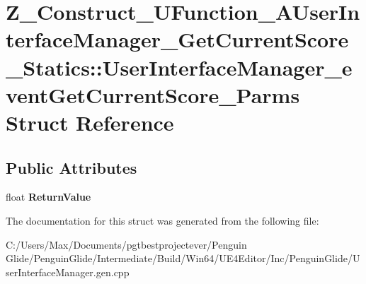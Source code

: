 \hypertarget{struct_z___construct___u_function___a_user_interface_manager___get_current_score___statics_1_1_u037d1197953daf6466aa6ebf222cb735}{}\section{Z\+\_\+\+Construct\+\_\+\+U\+Function\+\_\+\+A\+User\+Interface\+Manager\+\_\+\+Get\+Current\+Score\+\_\+\+Statics\+::User\+Interface\+Manager\+\_\+event\+Get\+Current\+Score\+\_\+\+Parms Struct Reference}
\label{struct_z___construct___u_function___a_user_interface_manager___get_current_score___statics_1_1_u037d1197953daf6466aa6ebf222cb735}
\subsection*{Public Attributes}
\begin{DoxyCompactItemize}
\item 
\mbox{\label{struct_z___construct___u_function___a_user_interface_manager___get_current_score___statics_1_1_u037d1197953daf6466aa6ebf222cb735_afd0496b66c21801ef6dea6b56271d96f}} 
float {\bfseries Return\+Value}
\end{DoxyCompactItemize}


The documentation for this struct was generated from the following file\+:\begin{DoxyCompactItemize}
\item 
C\+:/\+Users/\+Max/\+Documents/pgtbestprojectever/\+Penguin Glide/\+Penguin\+Glide/\+Intermediate/\+Build/\+Win64/\+U\+E4\+Editor/\+Inc/\+Penguin\+Glide/User\+Interface\+Manager.\+gen.\+cpp\end{DoxyCompactItemize}
